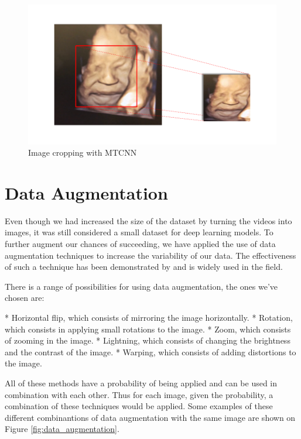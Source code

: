 \begin{figure}[h!tp]
    \centering
    \includegraphics[width=.9\textwidth]{imgs/chap3_cropping.png}
    \caption{Image cropping with MTCNN}
    \label{fig:cropping}
\end{figure}

\section{Data Augmentation}

Even though we had increased the size of the dataset by turning the videos into images, it was still considered a small dataset for deep learning models. To further augment our chances of succeeding, we have applied the use of data augmentation techniques to increase the variability of our data. The effectiveness of such a technique has been demonstrated by \cite{abs-1712-04621} and is widely used in the field.

There is a range of possibilities for using data augmentation, the ones we've chosen are:

* Horizontal flip, which consists of mirroring the image horizontally. 
* Rotation, which consists in applying small rotations to the image.
* Zoom, which consists of zooming in the image.
* Lightning, which consists of changing the brightness and the contrast of the image.
* Warping, which consists of adding distortions to the image. 

All of these methods have a probability of being applied and can be used in combination with each other. Thus for each image, given the probability, a combination of these techniques would be applied. Some examples of these different combinantions of data augmentation with the same image are shown on Figure \ref{fig:data_augmentation}.

